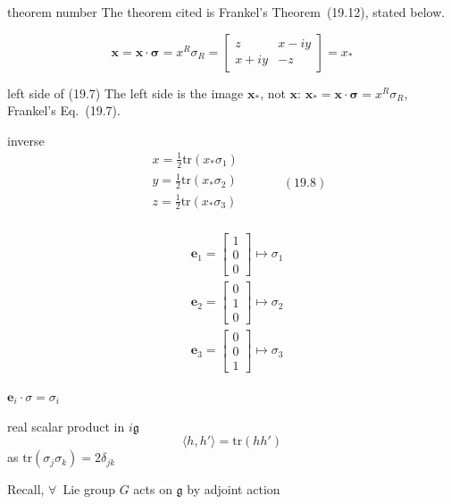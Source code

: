 \begin{correction}{theorem number}
The theorem cited is Frankel's Theorem~(19.12), stated below.
\end{correction}

\[
\mathbf{x} = \mathbf{x} \cdot \mathbf{\sigma} = x^R \sigma_R = \left[ \begin{matrix} z & x - iy \\ x+ iy & - z \end{matrix} \right] = x_*
\]
\begin{correction}{left side of (19.7)}
The left side is the image $\mathbf x_*$, not $\mathbf x$: $\mathbf x_*=\mathbf x\cdot\boldsymbol\sigma=x^R\sigma_R$, Frankel's Eq.~(19.7).
\end{correction}

inverse
\[
\begin{aligned}
  & x = \frac{1}{2} \text{tr}{ ( x_* \sigma_1 ) }  \\
  & y = \frac{1}{2} \text{tr}{ ( x_* \sigma_2 ) }  \\
  & z = \frac{1}{2} \text{tr}{ ( x_* \sigma_3 ) }  \\
\end{aligned} \quad \quad \quad \, (19.8)
\]

\[
\begin{aligned}
  & \mathbf{e}_1 = \left[ \begin{matrix} 1 \\ 0 \\ 0 \end{matrix} \right] \mapsto \sigma_1 \\ 
  & \mathbf{e}_2 = \left[ \begin{matrix} 0 \\ 1 \\ 0 \end{matrix} \right] \mapsto \sigma_2 \\ 
  & \mathbf{e}_3 = \left[ \begin{matrix} 0 \\ 0 \\ 1 \end{matrix} \right] \mapsto \sigma_3 
\end{aligned}
\]

$\mathbf{e}_i \cdot \sigma = \sigma_i$

real scalar product in $i\mathfrak{g}$ 
\[
\langle h, h' \rangle = \text{tr}(hh')
\]
as $\text{tr}{ (\sigma_j \sigma_k)} = 2\delta_{jk}$

Recall, $\forall \, $ Lie group $G$ acts on $\mathfrak{g}$ by adjoint action

